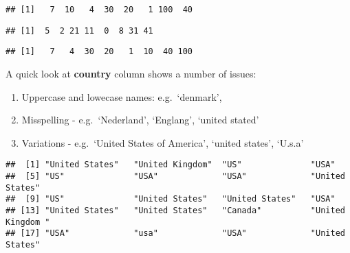 \documentclass[
]{article}
\newenvironment{Shaded}{\begin{snugshade}}{\end{snugshade}}
\newcommand{\AttributeTok}[1]{\textcolor[rgb]{0.77,0.63,0.00}{#1}}
\newcommand{\DecValTok}[1]{\textcolor[rgb]{0.00,0.00,0.81}{#1}}
\newcommand{\FunctionTok}[1]{\textcolor[rgb]{0.00,0.00,0.00}{#1}}
\newcommand{\NormalTok}[1]{#1}
\newcommand{\SpecialCharTok}[1]{\textcolor[rgb]{0.00,0.00,0.00}{#1}}
\providecommand{\tightlist}{%
  \setlength{\itemsep}{0pt}\setlength{\parskip}{0pt}}
\begin{document}
\begin{verbatim}
## [1]   7  10   4  30  20   1 100  40
\end{verbatim}

\begin{Shaded}
\end{Shaded}

\begin{verbatim}
## [1]  5  2 21 11  0  8 31 41
\end{verbatim}

\begin{Shaded}
\end{Shaded}

\begin{verbatim}
## [1]   7   4  30  20   1  10  40 100
\end{verbatim}

A quick look at \textbf{country} column shows a number of issues:

\begin{enumerate}
\def\labelenumi{\arabic{enumi}.}
\tightlist
\item
  Uppercase and lowecase names: e.g.~`denmark',
\item
  Misspelling - e.g.~`Nederland', `Englang', `united stated'
\item
  Variations - e.g.~`United States of America', `united states', `U.s.a'
\end{enumerate}

\begin{Shaded}
\end{Shaded}

\begin{verbatim}
##  [1] "United States"   "United Kingdom"  "US"              "USA"            
##  [5] "US"              "USA"             "USA"             "United States"  
##  [9] "US"              "United States"   "United States"   "USA"            
## [13] "United States"   "United States"   "Canada"          "United Kingdom "
## [17] "USA"             "usa"             "USA"             "United States"
\end{verbatim}
\end{document}
